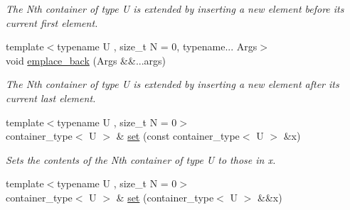 \begin{DoxyCompactItemize}
\begin{DoxyCompactList}\small\item\em The Nth container of type U is extended by inserting a new element before its current first element. \end{DoxyCompactList}\item 
\hypertarget{classheterogeneous_1_1heterolist_3_01_t_00_01_types_8_8_8_4_ac6e1e2d16c08cb943815f465406b77aa}{}{\footnotesize template$<$typename U , size\+\_\+t N = 0, typename... Args$>$ }\\void \hyperlink{classheterogeneous_1_1heterolist_3_01_t_00_01_types_8_8_8_4_ac6e1e2d16c08cb943815f465406b77aa}{emplace\+\_\+back} (Args \&\&...args)\label{classheterogeneous_1_1heterolist_3_01_t_00_01_types_8_8_8_4_ac6e1e2d16c08cb943815f465406b77aa}

\begin{DoxyCompactList}\small\item\em The Nth container of type U is extended by inserting a new element after its current last element. \end{DoxyCompactList}\item 
\hypertarget{classheterogeneous_1_1heterolist_3_01_t_00_01_types_8_8_8_4_a591fafee2c608371b2b66206ce49750c}{}{\footnotesize template$<$typename U , size\+\_\+t N = 0$>$ }\\container\+\_\+type$<$ U $>$ \& \hyperlink{classheterogeneous_1_1heterolist_3_01_t_00_01_types_8_8_8_4_a591fafee2c608371b2b66206ce49750c}{set} (const container\+\_\+type$<$ U $>$ \&x)\label{classheterogeneous_1_1heterolist_3_01_t_00_01_types_8_8_8_4_a591fafee2c608371b2b66206ce49750c}

\begin{DoxyCompactList}\small\item\em Sets the contents of the Nth container of type U to those in x. \end{DoxyCompactList}\item 
\hypertarget{classheterogeneous_1_1heterolist_3_01_t_00_01_types_8_8_8_4_a567225bf8a174499078f3c823aa50a43}{}{\footnotesize template$<$typename U , size\+\_\+t N = 0$>$ }\\container\+\_\+type$<$ U $>$ \& \hyperlink{classheterogeneous_1_1heterolist_3_01_t_00_01_types_8_8_8_4_a567225bf8a174499078f3c823aa50a43}{set} (container\+\_\+type$<$ U $>$ \&\&x)\label{classheterogeneous_1_1heterolist_3_01_t_00_01_types_8_8_8_4_a567225bf8a174499078f3c823aa50a43}


\end{DoxyCompactItemize}
